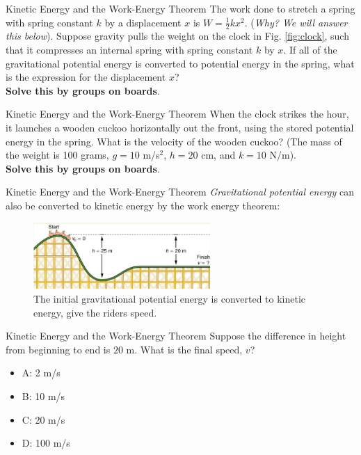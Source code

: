 \documentclass{beamer}
\begin{document}
\begin{frame}{Kinetic Energy and the Work-Energy Theorem}
The work done to stretch a spring with spring constant $k$ by a displacement $x$ is $W = \frac{1}{2}kx^2$.  (\textit{Why?  We will answer this below}).  Suppose gravity pulls the weight on the clock in Fig. \ref{fig:clock}, such that it compresses an internal spring with spring constant $k$ by $x$.  If all of the gravitational potential energy is converted to potential energy in the spring, what is the expression for the displacement $x$? \\ \vspace{1cm}
\textbf{Solve this by groups on boards}.
\end{frame}

\begin{frame}{Kinetic Energy and the Work-Energy Theorem}
When the clock strikes the hour, it launches a wooden cuckoo horizontally out the front, using the stored potential energy in the spring.  What is the velocity of the wooden cuckoo?  (The mass of the weight is 100 grams, $g = 10$ m/s$^2$, $h = 20$ cm, and $k = 10$ N/m).\\ \vspace{1cm}
\textbf{Solve this by groups on boards}.
\end{frame}

\begin{frame}{Kinetic Energy and the Work-Energy Theorem}
\textit{Gravitational potential energy} can also be converted to kinetic energy by the work energy theorem:
\begin{figure}
\centering
\includegraphics[width=0.6\textwidth,trim=0.25cm 0cm 0cm 0.25cm,clip=true]{figures/roller.png}
\caption{\label{fig:roller} The initial gravitational potential energy is converted to kinetic energy, give the riders speed.}
\end{figure}
\end{frame}

\begin{frame}{Kinetic Energy and the Work-Energy Theorem}
Suppose the difference in height from beginning to end is $20$ m.  What is the final speed, $v$? \\ \vspace{1cm}
\begin{itemize}
\item A: 2 m/s
\item B: 10 m/s
\item C: 20 m/s
\item D: 100 m/s
\end{itemize}
\end{frame}
\end{document}
